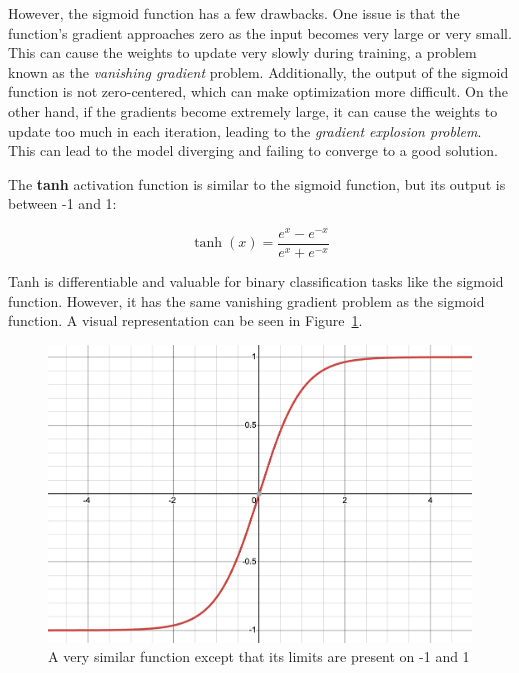 However, the sigmoid function has a few drawbacks. One issue is that the function's gradient approaches zero as the input becomes very large or very small. This can cause the weights to update very slowly during training, a problem known as the \textit{vanishing gradient} problem. Additionally, the output of the sigmoid function is not zero-centered, which can make optimization more difficult. On the other hand, if the gradients become extremely large, it can cause the weights to update too much in each iteration, leading to the \textit{gradient explosion problem}. This can lead to the model diverging and failing to converge to a good solution. 

\label{sec:tanh}

The \textbf{\acf{tanh}} activation function is similar to the sigmoid function, but its output is between -1 and 1:

\begin{equation}
	\tanh(x) = \frac{e^x - e^{-x}}{e^x + e^{-x}}
\end{equation}

Tanh is differentiable and valuable for binary classification tasks like the sigmoid function. However, it has the same vanishing gradient problem as the sigmoid function. A visual representation can be seen in Figure~\ref{fig:tanh}.

\begin{figure}[ht]
    \centering
    \includegraphics[width=\textwidth/2]{figures/2-sota/activation/tanh.png}
    \caption[Tanh Activation Function]{A very similar function except that its limits are present on -1 and 1}
    \label{fig:tanh}
\end{figure}

